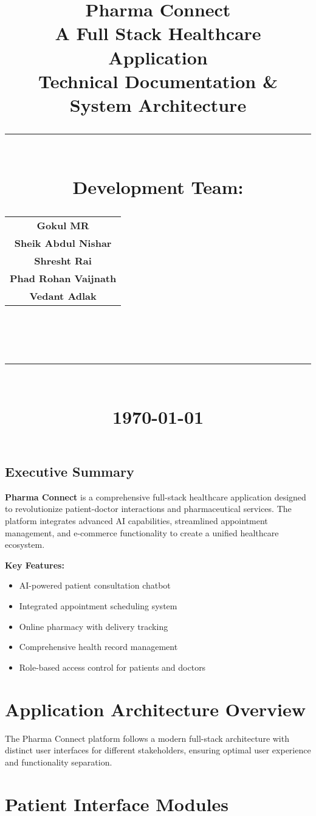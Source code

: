 \documentclass[12pt]{article}
\title{
    \vspace*{-2cm}
    {\Huge\bfseries\color{primaryblue} Pharma Connect}\\[0.7cm]
    {\Large\color{secondaryblue} A Full Stack Healthcare Application}\\[0.5cm]
    {\large\color{darkgray} Technical Documentation \& System Architecture}\\[0.7cm]
    \rule{\textwidth}{1.5pt}\\[0.7cm]
    {\normalsize\color{primaryblue}\textbf{Development Team:}}\\[0.2cm]
    \begin{tabular}{c}
        \textbf{Gokul MR} \\
        \textbf{Sheik Abdul Nishar} \\
        \textbf{Shresht Rai} \\
        \textbf{Phad Rohan Vaijnath} \\
        \textbf{Vedant Adlak}
    \end{tabular}\\[0.7cm]
    \rule{\textwidth}{0.5pt}\\[0.5cm]
    {\normalsize\color{darkgray} \today}
}
\author{}
\date{}
\begin{document}
\maketitle
\thispagestyle{empty}

\newpage

\begin{infobox}
\section*{Executive Summary}
\textbf{Pharma Connect} is a comprehensive full-stack healthcare application designed to revolutionize patient-doctor interactions and pharmaceutical services. The platform integrates advanced AI capabilities, streamlined appointment management, and e-commerce functionality to create a unified healthcare ecosystem.

\vspace{0.3cm}
\textbf{Key Features:}
\begin{itemize}[leftmargin=1cm]
    \item AI-powered patient consultation chatbot
    \item Integrated appointment scheduling system
    \item Online pharmacy with delivery tracking
    \item Comprehensive health record management
    \item Role-based access control for patients and doctors
\end{itemize}
\vspace{0.3cm}
\end{infobox}

\section{Application Architecture Overview}

The Pharma Connect platform follows a modern full-stack architecture with distinct user interfaces for different stakeholders, ensuring optimal user experience and functionality separation.

\section{Patient Interface Modules}
\end{document}
